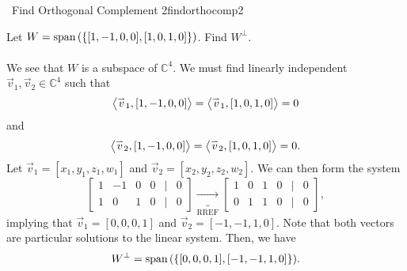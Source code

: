         \begin{example}{\Difficulty\,\Difficulty\,\,Find Orthogonal Complement 2}{findorthocomp2}

            Let \(W=\text{span\,}(\{[1,-1,0,0],[1,0,1,0]\})\). Find \(W^\perp\).
            \\
            \\
            We see that \(W\) is a subspace of \(\mathbb{C}^4\). We must find linearly independent \(\vec{v}_1,\vec{v}_2\in\mathbb{C}^4\) such that
            \begin{equation*}
                \left\langle \overset{_{\rightharpoonup}}{v}_1,[1,-1,0,0]\right\rangle=\left\langle \overset{_{\rightharpoonup}}{v}_1,[1,0,1,0]\right\rangle=0
            \end{equation*}
            and
            \begin{equation*}
                \left\langle \overset{_{\rightharpoonup}}{v}_2,[1,-1,0,0]\right\rangle=\left\langle \overset{_{\rightharpoonup}}{v}_2,[1,0,1,0]\right\rangle=0.
            \end{equation*}
            Let \(\vec{v}_1=[x_1,y_1,z_1,w_1]\) and \(\vec{v}_2=[x_2,y_2,z_2,w_2]\). We can then form the system
            \begin{equation*}
                \begin{bmatrix}
                    1 & -1 & 0 & 0 & | & 0 \\
                    1 & 0 & 1 & 0 & | & 0
                \end{bmatrix}\underbrace{\to}_{\text{RREF}}\begin{bmatrix}
                    1 & 0 & 1 & 0 & | & 0 \\
                    0 & 1 & 1 & 0 & | & 0
                \end{bmatrix},
            \end{equation*}
            implying that \(\vec{v}_1=[0,0,0,1]\) and \(\vec{v}_2=[-1,-1,1,0]\). Note that both vectors are particular solutions to the linear system. Then, we have
            \begin{equation*}
                W^\perp=\text{span\,}(\{[0,0,0,1],[-1,-1,1,0]\}).
            \end{equation*}
            
        \end{example}
        \pagebreak
